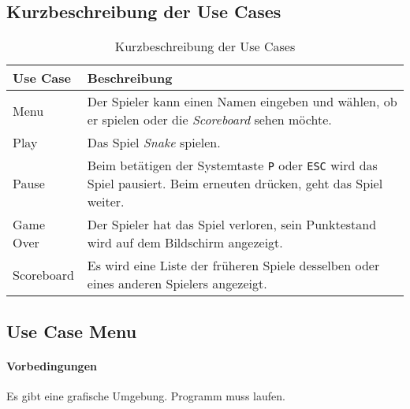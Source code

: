 \documentclass[a4paper, twosided, 11pt]{scrartcl}
\begin{document}
\subsection{Kurzbeschreibung der Use Cases}
\begin{table}[H]
  \centering
  \begin{tabular}{lp{.75\linewidth}}
    \toprule
    Use Case & Beschreibung \\
    \midrule

    Menu & Der Spieler kann einen Namen eingeben und wählen, ob er spielen oder
    die \emph{Scoreboard} sehen möchte. \\

    Play & Das Spiel \emph{Snake} spielen. \\

    Pause & Beim betätigen der Systemtaste \texttt{P} oder \texttt{ESC} wird
    das Spiel pausiert. Beim erneuten drücken, geht das Spiel weiter. \\

    Game Over & Der Spieler hat das Spiel verloren, sein Punktestand wird auf
    dem Bildschirm angezeigt. \\

    Scoreboard & Es wird eine Liste der früheren Spiele desselben oder eines
    anderen Spielers angezeigt. \\

    \bottomrule
  \end{tabular}
  \caption{Kurzbeschreibung der Use Cases}
\end{table}

\subsection{Use Case Menu}
\paragraph{Vorbedingungen} Es gibt eine grafische Umgebung. Programm muss laufen.
\end{document}
